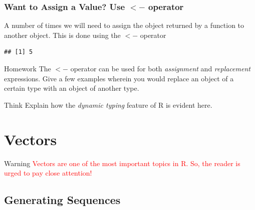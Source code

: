 \subsubsection{Want to Assign a Value? Use $<-$ operator}
\noindent A number of times we will need to assign the object returned by a function to another object. This is done using the $<-$ operator 
\begin{knitrout}
\color{fgcolor}\begin{kframe}
\begin{alltt}
 \hlkwb{<-}  \hlopt{+} 
\end{alltt}
\begin{verbatim}
## [1] 5
\end{verbatim}
\end{kframe}
\end{knitrout}

\begin{DIY}{Homework}
The $<-$ operator can be used for both \emph{assignment} and \emph{replacement} expressions. Give a few examples wherein you would replace an object of a certain type with an object of another type.
\end{DIY}

\begin{DIY}{Think}
Explain how the \emph{dynamic typing} feature of R is evident here. 
\end{DIY}


\newpage
\section{Vectors}
\begin{HIGHLIGHT}
\par{}
\end{HIGHLIGHT}

\begin{DIY}{Warning}
\textcolor{red}{Vectors are one of the most important topics in R. So, the reader is urged to pay close attention!}
\end{DIY}

\subsection{Generating Sequences}
